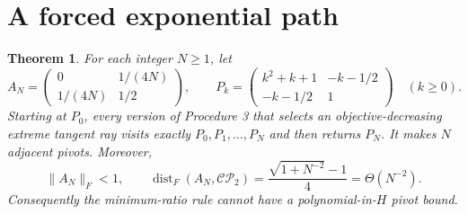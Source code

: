\documentclass[11pt]{article}
\newtheorem{theorem}{Theorem}[section]
\theoremstyle{remark}\newtheorem{remark}[theorem]{Remark}
\newcommand{\CP}{\mathcal{CP}}
\newcommand{\norm}[1]{\lVert#1\rVert}
\begin{document}
\section{A forced exponential path}\label{sec:lower}
\begin{theorem}\label{thm:lower}
For each integer $N\ge1$, let
\[
 A_N=\begin{pmatrix}0&1/(4N)\\1/(4N)&1/2\end{pmatrix},\qquad
 P_k=\begin{pmatrix}k^2+k+1&-k-1/2\\-k-1/2&1\end{pmatrix}\quad(k\ge0).
\]
Starting at $P_0$, every version of Procedure 3 that selects an objective-decreasing extreme tangent ray visits exactly $P_0,P_1,\ldots,P_N$ and then returns $P_N$. It makes $N$ adjacent pivots. Moreover,
\[
 \norm{A_N}_F<1,\qquad
 \operatorname{dist}_F(A_N,\CP_2)
 =\frac{\sqrt{1+N^{-2}}-1}{4}=\Theta(N^{-2}).
\]
Consequently the minimum-ratio rule cannot have a polynomial-in-$H$ pivot bound.
\end{theorem}
\end{document}
